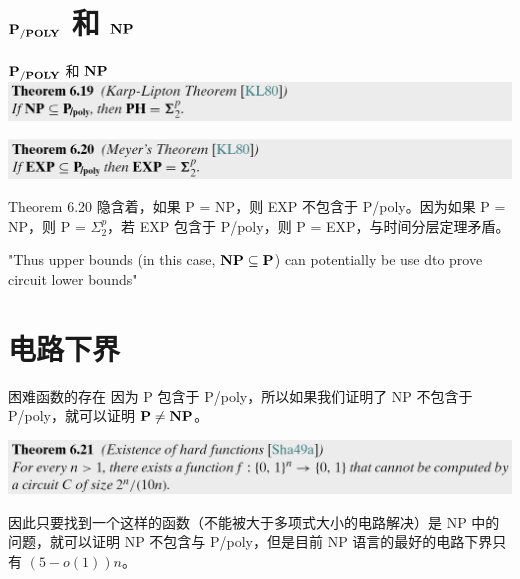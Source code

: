 \documentclass[UTF8,aspectratio=169,mathserif]{beamer}
\begin{document}
	\section{$\bf P_{/POLY}$ 和 $\bf NP$}
	\begin{frame}{$\bf P_{/POLY}$ 和 $\bf NP$}
		\includegraphics[width=\linewidth]{../../5 & 6/note.assets/image-20210427154847848.png}\newline
		
		\includegraphics[width=\linewidth]{../../5 & 6/note.assets/image-20210427154857049.png}\newline
		
		Theorem 6.20 隐含着，如果 P = NP，则 EXP 不包含于 P/poly。因为如果 P = NP，则 P = $\Sigma_2^p$，若 EXP 包含于 P/poly，则 P = EXP，与时间分层定理矛盾。\newline
		
		"Thus upper bounds (in this case, $\bf NP\subseteq P$) can potentially be use dto prove circuit lower bounds"
	\end{frame}
	
	\section{电路下界}
	\begin{frame}{困难函数的存在}
		因为 P 包含于 P/poly，所以如果我们证明了 NP 不包含于 P/poly，就可以证明 $\bf P\neq NP$。\newline
		
		\includegraphics[width=\linewidth]{../../5 & 6/note.assets/image-20210427160637215.png}\newline
		
		因此只要找到一个这样的函数（不能被大于多项式大小的电路解决）是 NP 中的问题，就可以证明 NP 不包含与 P/poly，但是目前 NP 语言的最好的电路下界只有 $(5-o(1))n$。
	\end{frame}
\end{document}
